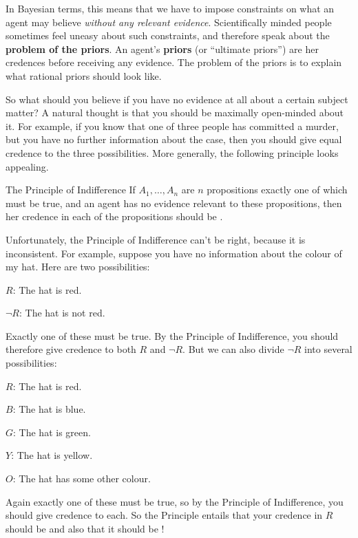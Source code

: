 In Bayesian terms, this means that we have to impose constraints on
what an agent may believe \emph{without any relevant
  evidence}. Scientifically minded people sometimes feel uneasy about such
constraints, and therefore speak about the \textbf{problem of the
  priors}. An agent's \textbf{priors} (or ``ultimate priors'') are her
credences before receiving any evidence. The problem of the priors is
to explain what rational priors should look like. 

So what should you believe if you have no evidence at all about a
certain subject matter? A natural thought is that you should be
maximally open-minded about it. For example, if you know that one of
three people has committed a murder, but you have no further
information about the case, then you should give equal credence to the
three possibilities. More generally, the following principle looks
appealing.

\begin{genericthm}{The Principle of Indifference}
  If $A_1,\ldots,A_n$ are $n$ propositions exactly one of which must
  be true, and an agent has no evidence relevant to these
  propositions, then her credence in each of the propositions should
  be .
\end{genericthm}

Unfortunately, the Principle of Indifference can't be right, because it is
inconsistent. For example, suppose you have no information about the
colour of my hat. Here are two possibilities:
\begin{enumerate*}
\item[$R$:] The hat is red.
\item[$\neg R$:] The hat is not red.
\end{enumerate*}
Exactly one of these must be true. By the Principle of Indifference,
you should therefore give credence  to both $R$ and
$\neg R$. But we can also divide $\neg R$ into several
possibilities:
\begin{enumerate*}
\item[$R$:] The hat is red.
\item[$B$:] The hat is blue.
\item[$G$:] The hat is green.
\item[$Y$:] The hat is yellow.
\item[$O$:] The hat has some other colour.
\end{enumerate*}
Again exactly one of these must be true, so by the Principle of
Indifference, you should give credence  to each. So the
Principle entails that your credence in $R$ should be 
and also that it should be !

